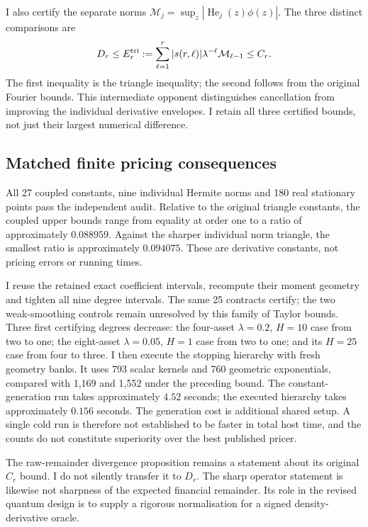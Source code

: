 I also certify the separate norms
$\mathcal M_j=\sup_z|\operatorname{He}_j(z)\phi(z)|$. The three distinct comparisons
are
\[
 D_r\leq E_r^{\rm tri}:=
       \sum_{\ell=1}^r|s(r,\ell)|\lambda^{-\ell}\mathcal M_{\ell-1}
       \leq C_r.
\]
The first inequality is the triangle inequality; the second follows from
the original Fourier bounds. This intermediate opponent distinguishes
cancellation from improving the individual derivative envelopes. I retain
all three certified bounds, not just their largest numerical difference.

\subsection{Matched finite pricing consequences}

All 27 coupled constants, nine individual Hermite norms and 180 real
stationary points pass the independent audit. Relative to the original
triangle constants, the coupled upper bounds range from equality at order
one to a ratio of approximately $0.088959$. Against the sharper individual
norm triangle, the smallest ratio is approximately $0.094075$.
These are derivative constants, not pricing errors or running times.

I reuse the retained exact coefficient intervals, recompute their moment
geometry and tighten all nine degree intervals. The same 25 contracts
certify; the two weak-smoothing controls remain unresolved by this family
of Taylor bounds. Three first certifying degrees decrease:
the four-asset $\lambda=0.2$, $H=10$ case from two to one;
the eight-asset $\lambda=0.05$, $H=1$ case from two to one; and its
$H=25$ case from four to three. I then execute the stopping hierarchy with
fresh geometry banks. It uses 793 scalar kernels and 760 geometric
exponentials, compared with 1,169 and 1,552 under the preceding bound.
The constant-generation run takes approximately $4.52$ seconds; the
executed hierarchy takes approximately $0.156$ seconds. The generation
cost is additional shared setup. A single cold run is therefore not
established to be faster in total host time, and the counts do not
constitute superiority over the best published pricer.

The raw-remainder divergence proposition remains a statement about its
original $C_r$ bound. I do not silently transfer it to $D_r$. The sharp
operator statement is likewise not sharpness of the expected financial
remainder. Its role in the revised quantum design is to supply a rigorous
normalisation for a signed density-derivative oracle.
